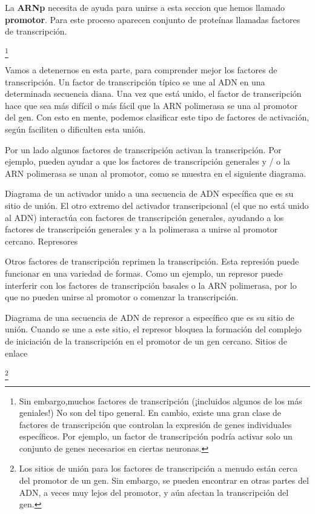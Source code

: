  La \textbf{ARNp} necesita de ayuda para unirse a esta seccion que hemos llamado \textbf{promotor}. Para este proceso aparecen conjunto de proteínas llamadas factores de transcripción.
 
 \footnote{Sin embargo,muchos factores de transcripción (¡incluidos algunos de los más geniales!) No son del tipo general. En cambio, existe una gran clase de factores de transcripción que controlan la expresión de genes individuales específicos. Por ejemplo, un factor de transcripción podría activar solo un conjunto de genes necesarios en ciertas neuronas.}
 
 Vamos a detenernos en esta parte, para comprender mejor los factores de transcripción. Un factor de transcripción típico se une al ADN en una determinada secuencia diana. Una vez que está unido, el factor de transcripción hace que sea más difícil o más fácil que la ARN polimerasa se una al promotor del gen. Con esto en mente, podemos clasificar este tipo de factores de activación, según faciliten o dificulten esta unión.
 
 Por un lado algunos factores de transcripción activan la transcripción. Por ejemplo, pueden ayudar a que los factores de transcripción generales y / o la ARN polimerasa se unan al promotor, como se muestra en el siguiente diagrama.
 
 Diagrama de un activador unido a una secuencia de ADN específica que es su sitio de unión. El otro extremo del activador transcripcional (el que no está unido al ADN) interactúa con factores de transcripción generales, ayudando a los factores de transcripción generales y a la polimerasa a unirse al promotor cercano.
 Represores
 
 Otros factores de transcripción reprimen la transcripción. Esta represión puede funcionar en una variedad de formas. Como un ejemplo, un represor puede interferir con los factores de transcripción basales o la ARN polimerasa, por lo que no pueden unirse al promotor o comenzar la transcripción.
 
 
 Diagrama de una secuencia de ADN de represor a específico que es su sitio de unión. Cuando se une a este sitio, el represor bloquea la formación del complejo de iniciación de la transcripción en el promotor de un gen cercano.
 Sitios de enlace
 
 \footnote{Los sitios de unión para los factores de transcripción a menudo están cerca del promotor de un gen. Sin embargo, se pueden encontrar en otras partes del ADN, a veces muy lejos del promotor, y aún afectan la transcripción del gen.}
 
